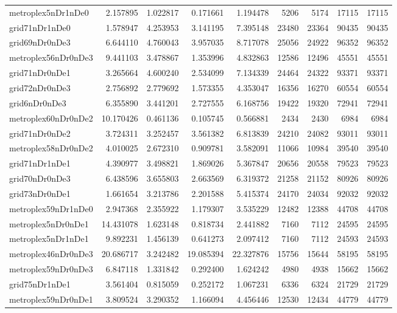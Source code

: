 \begin{longtable}{|l|r|r|r|r|r|r|r|r|}
metroplex5nDr1nDe0 & 2.157895 & 1.022817 & 0.171661 & 1.194478 & 5206 & 5174 & 17115 & 17115 \\
grid71nDr1nDe0 & 1.578947 & 4.253953 & 3.141195 & 7.395148 & 23480 & 23364 & 90435 & 90435 \\
grid69nDr0nDe3 & 6.644110 & 4.760043 & 3.957035 & 8.717078 & 25056 & 24922 & 96352 & 96352 \\
metroplex56nDr0nDe3 & 9.441103 & 3.478867 & 1.353996 & 4.832863 & 12586 & 12496 & 45551 & 45551 \\
grid71nDr0nDe1 & 3.265664 & 4.600240 & 2.534099 & 7.134339 & 24464 & 24322 & 93371 & 93371 \\
grid72nDr0nDe3 & 2.756892 & 2.779692 & 1.573355 & 4.353047 & 16356 & 16270 & 60554 & 60554 \\
grid6nDr0nDe3 & 6.355890 & 3.441201 & 2.727555 & 6.168756 & 19422 & 19320 & 72941 & 72941 \\
metroplex60nDr0nDe2 & 10.170426 & 0.461136 & 0.105745 & 0.566881 & 2434 & 2430 & 6984 & 6984 \\
grid71nDr0nDe2 & 3.724311 & 3.252457 & 3.561382 & 6.813839 & 24210 & 24082 & 93011 & 93011 \\
metroplex58nDr0nDe2 & 4.010025 & 2.672310 & 0.909781 & 3.582091 & 11066 & 10984 & 39540 & 39540 \\
grid71nDr1nDe1 & 4.390977 & 3.498821 & 1.869026 & 5.367847 & 20656 & 20558 & 79523 & 79523 \\
grid70nDr0nDe3 & 6.438596 & 3.655803 & 2.663569 & 6.319372 & 21258 & 21152 & 80926 & 80926 \\
grid73nDr0nDe1 & 1.661654 & 3.213786 & 2.201588 & 5.415374 & 24170 & 24034 & 92032 & 92032 \\
metroplex59nDr1nDe0 & 2.947368 & 2.355922 & 1.179307 & 3.535229 & 12482 & 12388 & 44708 & 44708 \\
metroplex5nDr0nDe1 & 14.431078 & 1.623148 & 0.818734 & 2.441882 & 7160 & 7112 & 24595 & 24595 \\
metroplex5nDr1nDe1 & 9.892231 & 1.456139 & 0.641273 & 2.097412 & 7160 & 7112 & 24593 & 24593 \\
metroplex46nDr0nDe3 & 20.686717 & 3.242482 & 19.085394 & 22.327876 & 15756 & 15644 & 58195 & 58195 \\
metroplex59nDr0nDe3 & 6.847118 & 1.331842 & 0.292400 & 1.624242 & 4980 & 4938 & 15662 & 15662 \\
grid75nDr1nDe1 & 3.561404 & 0.815059 & 0.252172 & 1.067231 & 6336 & 6324 & 21729 & 21729 \\
metroplex59nDr0nDe1 & 3.809524 & 3.290352 & 1.166094 & 4.456446 & 12530 & 12434 & 44779 & 44779 \\

\end{longtable}
